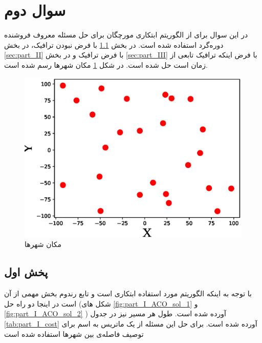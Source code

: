 \section{سوال دوم}
در این سوال برای از الگوریتم ابتکاری مورچگان برای حل مسئله معروف فروشنده دوره‌گرد استفاده شده است. در بخش
\ref{sec:part_I}
با فرض نبودن ترافیک،
در بخش
\ref{sec:part_II}
با فرض ترافیک و در بخش
\ref{sec:part_III}
با فرض اینکه ترافیک تابعی از زمان است حل شده است. در شکل
\ref{fig:cities}
مکان شهر‌ها رسم شده است.
\begin{figure}[H]\label{fig:cities}
	\caption{مکان شهرها} 
	\centering 
	\includegraphics[width=16cm]{../Figure/Q2/Cities} 
\end{figure}
\subsection{پخش اول}\label{sec:part_I}
با توجه به اینکه الگوریتم مورد استفاده ابتکاری است و تابع رندوم بخش مهمی از آن است در اینجا دو راه حل (شکل های
\ref{fig:part_I_ACO_sol_1}
و 
\ref{fig:part_I_ACO_sol_2}
) آورده شده است. طول هر مسیر نیز در جدول \ref{tab:part_I_cost}
آورده شده است. برای حل این مسئله از یک ماتریس به اسم
 برای توصیف فاصله‌ی بین شهرها استفاده شده است

